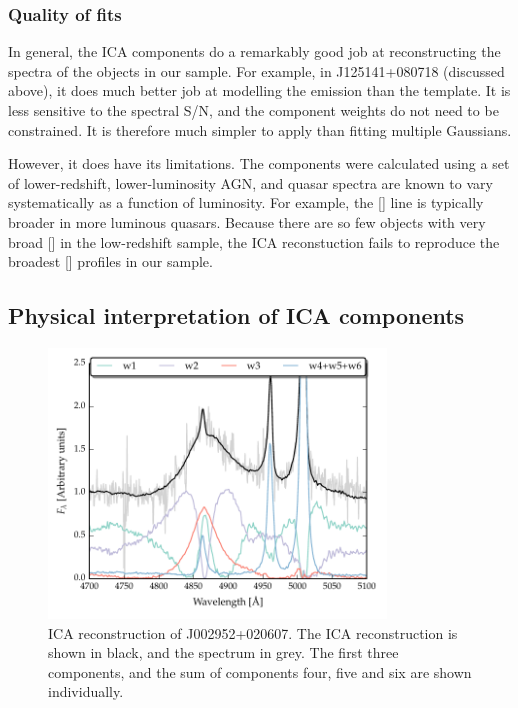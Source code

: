 \subsubsection{Quality of fits}

In general, the \ac{ICA} components do a remarkably good job at reconstructing the spectra of the objects in our sample. 
For example, in J125141+080718 (discussed above), it does much better job at modelling the  emission than the \citet{boroson92} template. 
It is less sensitive to the spectral \ac{S/N}, and the component weights do not need to be constrained. 
It is therefore much simpler to apply than fitting multiple Gaussians. 

However, it does have its limitations. 
The components were calculated using a set of lower-redshift, lower-luminosity \ac{AGN}, and quasar spectra are known to vary systematically as a function of luminosity. 
For example, the [] line is typically broader in more luminous quasars. 
Because there are so few objects with very broad [] in the low-redshift sample, the \ac{ICA} reconstuction fails to reproduce the broadest [] profiles in our sample. 

\subsection{Physical interpretation of \ac{ICA} components}

\begin{figure}
    \centering
    \includegraphics[width=0.8\textwidth]{figures/chapter04/mfica_components.pdf} 
    \caption{\ac{ICA} reconstruction of J002952+020607. The \ac{ICA} reconstruction is shown in black, and the spectrum in grey. The first three components, and the sum of components four, five and six are shown individually.}     
    \label{fig:mfica_components}
\end{figure}

